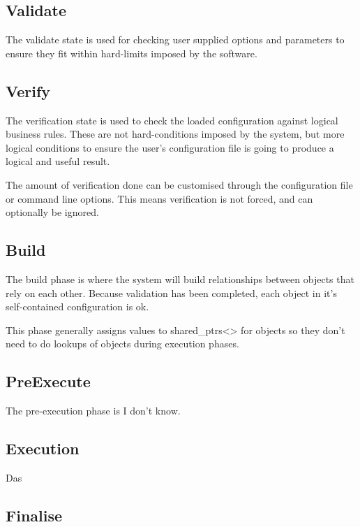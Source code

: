 \documentclass[a4paper,11pt,twoside,pdftex,draft]{article}
\begin{document}
\hypertarget{validate}{%
\subsection{Validate}\label{validate}}

The validate state is used for checking user supplied options and
parameters to ensure they fit within hard-limits imposed by the
software.

\hypertarget{verify}{%
\subsection{Verify}\label{verify}}

The verification state is used to check the loaded configuration against
logical business rules. These are not hard-conditions imposed by the
system, but more logical conditions to ensure the user's configuration
file is going to produce a logical and useful result.

The amount of verification done can be customised through the
configuration file or command line options. This means verification is
not forced, and can optionally be ignored.

\hypertarget{build}{%
\subsection{Build}\label{build}}

The build phase is where the system will build relationships between
objects that rely on each other. Because validation has been completed,
each object in it's self-contained configuration is ok.

This phase generally assigns values to
shared\_ptrs\textless\textgreater{} for objects so they don't need to do
lookups of objects during execution phases.

\hypertarget{preexecute}{%
\subsection{PreExecute}\label{preexecute}}

The pre-execution phase is I don't know.

\hypertarget{execution}{%
\subsection{Execution}\label{execution}}

Das

\hypertarget{finalise}{%
\subsection{Finalise}\label{finalise}}
\end{document}
